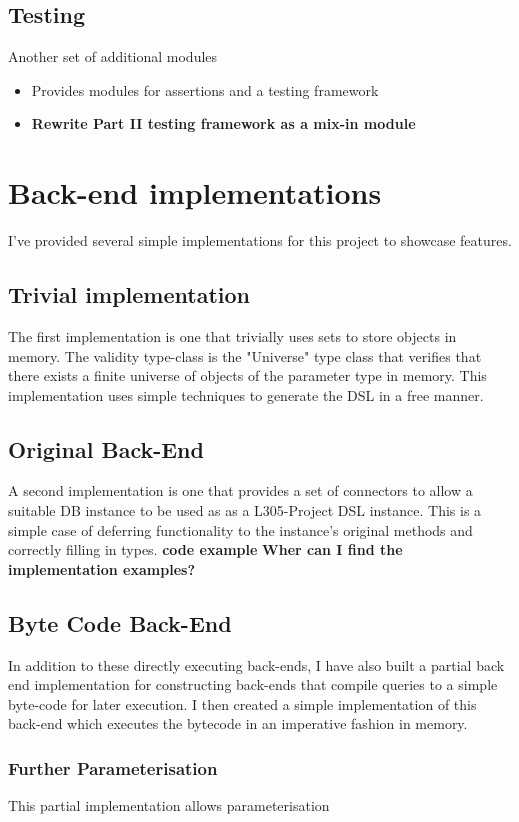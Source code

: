 \documentclass{report}
\newcommand \2[0]{\textbf{2}}
\newcommand \3[0]{\textbf{3}}
\newcommand{\todo}[1]{\textbf{#1}}
\begin{document}
\section{Testing}
Another set of additional modules
\begin{itemize}
    \item Provides modules for assertions and a testing framework
    \item \todo{Rewrite Part II testing framework as a mix-in module}
\end{itemize}

\chapter{Back-end implementations}

I've provided several simple implementations for this project to showcase features.
\section{Trivial implementation}
The first implementation is one that trivially uses sets  to store objects in memory. The validity type-class is the "Universe" type class that verifies that there exists a finite universe of objects of the parameter type in memory. This implementation uses simple techniques to generate the DSL in a free manner.

\section{Original Back-End}
A second implementation is one that provides a set of connectors to allow a suitable DB instance to be used as as a L305-Project DSL instance. This is a simple case of deferring functionality to the instance's original methods and correctly filling in types. 
\todo{code example}
\todo{Wher can I find the implementation examples?}

\section{Byte Code Back-End}

In addition to these directly executing back-ends, I have also built a partial back end implementation for constructing back-ends that compile queries to a simple byte-code for later execution. I then created a simple implementation of this back-end which executes the bytecode in an imperative fashion in memory.

\subsection{Further Parameterisation}
This partial implementation allows parameterisation
\end{document}
